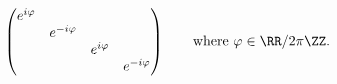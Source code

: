 \begin{equation}
  \label{eq:circle}
  \begin{pmatrix}
    e^{i\varphi} &  & & \\
    & e^{-i\varphi} & & \\
    & & e^{i\varphi} &  \\
    & & & e^{-i\varphi} \\
  \end{pmatrix}\qquad\text{where $\varphi \in \RR/2\pi\ZZ$.}
\end{equation}

